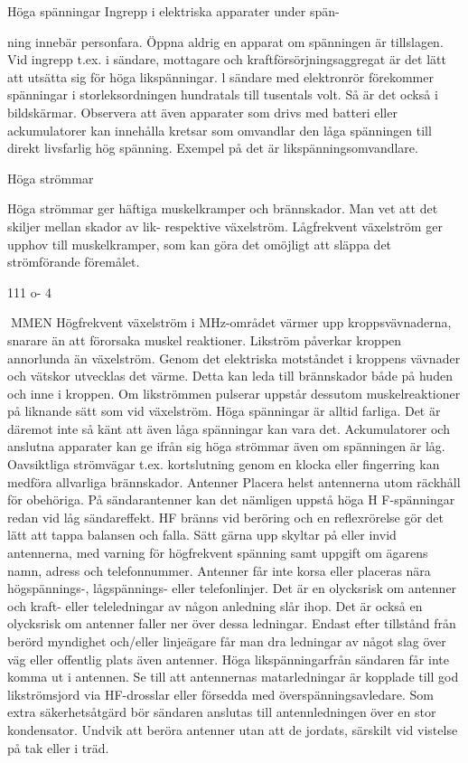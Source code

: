 \documentclass[a4paper,twoside,twocolumn,openright]{book}
\begin{document}
{{{{{Höga spänningar
Ingrepp i elektriska apparater under spän-

ning innebär personfara. Öppna aldrig en
apparat om spänningen är tillslagen. Vid
ingrepp t.ex. i sändare, mottagare och
kraftförsörjningsaggregat är det lätt att utsätta sig för höga likspänningar. l sändare
med elektronrör förekommer spänningar i
storleksordningen hundratals till tusentals
volt. Så är det också i bildskärmar.
Observera att även apparater som drivs
med batteri eller ackumulatorer kan innehålla kretsar som omvandlar den låga spänningen till direkt livsfarlig hög spänning. Exempel på det är likspänningsomvandlare.

Höga strömmar

Höga strömmar ger häftiga muskelkramper
och brännskador. Man vet att det skiljer
mellan skador av lik- respektive växelström.
Lågfrekvent växelström ger upphov till
muskelkramper, som kan göra det omöjligt
att släppa det strömförande föremålet.

111 o- 4

MMEN
Högfrekvent växelström i MHz-området
värmer upp kroppsvävnaderna, snarare än
att förorsaka muskel reaktioner.
Likström påverkar kroppen annorlunda
än växelström. Genom det elektriska motståndet i kroppens vävnader och vätskor
utvecklas det värme. Detta kan leda till brännskador både på huden och inne i kroppen.
Om likströmmen pulserar uppstår dessutom
muskelreaktioner på liknande sätt som vid
växelström.
Höga spänningar är alltid farliga. Det är
däremot inte så känt att även låga spänningar kan vara det. Ackumulatorer och anslutna apparater kan ge ifrån sig höga strömmar även om spänningen är låg. Oavsiktliga
strömvägar t.ex. kortslutning genom en
klocka eller fingerring kan medföra allvarliga
brännskador.
Antenner
Placera helst antennerna utom räckhåll för
obehöriga. På sändarantenner kan det nämligen uppstå höga H F-spänningar redan vid
låg sändareffekt. HF bränns vid beröring och
en reflexrörelse gör det lätt att tappa balansen och falla. Sätt gärna upp skyltar på eller
invid antennerna, med varning för högfrekvent spänning samt uppgift om ägarens
namn, adress och telefonnummer.
Antenner får inte korsa eller placeras
nära högspännings-, lågspännings- eller
telefonlinjer. Det är en olycksrisk om antenner och kraft- eller teleledningar av någon
anledning slår ihop. Det är också en olycksrisk om antenner faller ner över dessa ledningar.
Endast efter tillstånd från berörd myndighet
och/eller linjeägare får man dra ledningar av
något slag över väg eller offentlig plats även antenner.
Höga likspänningarfrån sändaren får inte
komma ut i antennen. Se till att antennernas
matarledningar är kopplade till god likströmsjord via HF-drosslar eller försedda med
överspänningsavledare. Som extra säkerhetsåtgärd bör sändaren anslutas till antennledningen över en stor kondensator.
Undvik att beröra antenner utan att de
jordats, särskilt vid vistelse på tak eller i träd.

}}}}}
\end{document}
